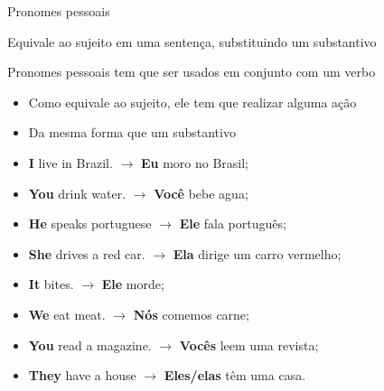 \documentclass[compress,mathserif,xcolor=table]{beamer}
\begin{document}
\begin{frame}{Pronomes pessoais}

Equivale ao sujeito em uma sentença, substituindo um substantivo

Pronomes pessoais tem que ser usados em conjunto com um verbo
\begin{itemize}
    \item Como equivale ao sujeito, ele tem que realizar alguma ação
    \item Da mesma forma que um substantivo
\end{itemize}

\vspace{0.5cm}

\begin{itemize}
    \item \textbf{I} live in Brazil. $\rightarrow$ \textbf{Eu} moro no Brasil;
    \item \textbf{You} drink water. $\rightarrow$ \textbf{Você} bebe agua;
    \item \textbf{He} speaks portuguese $\rightarrow$ \textbf{Ele} fala português;
    \item \textbf{She} drives a red car. $\rightarrow$ \textbf{Ela} dirige um carro vermelho;
    \item \textbf{It} bites. $\rightarrow$ \textbf{Ele} morde;
    \item \textbf{We} eat meat. $\rightarrow$ \textbf{Nós} comemos carne;
    \item \textbf{You} read a magazine. $\rightarrow$ \textbf{Vocês} leem uma revista;
    \item \textbf{They} have a house $\rightarrow$ \textbf{Eles/elas} têm uma casa.
\end{itemize}

\end{frame}

\end{document}

